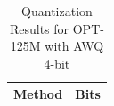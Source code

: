 \begin{table}[ht]
\centering
\caption{Quantization Results for OPT-125M with AWQ 4-bit}
\begin{tabular}{ll}
\toprule
Method & Bits \\
\midrule
\bottomrule
\end{tabular}
\end{table}